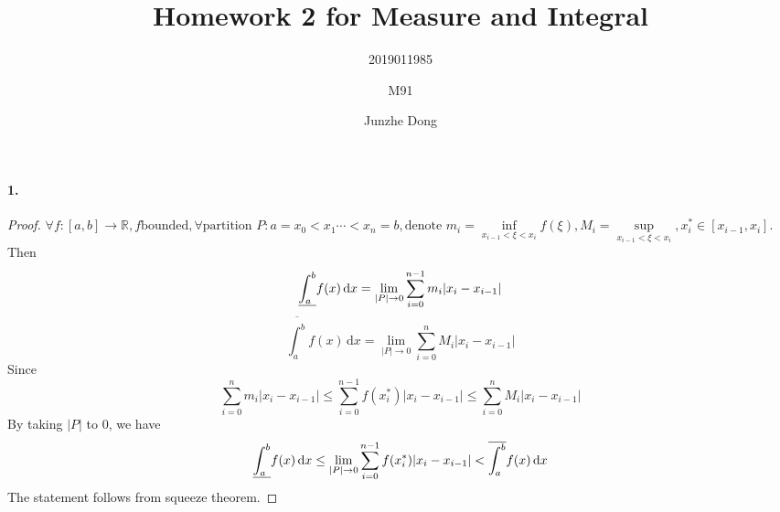 \documentclass{article}
\author{2019011985\and M91\and Junzhe Dong}
\title{Homework 2 for Measure and Integral}
\begin{document}
\maketitle

\newcommand{\dd}{\,\mathrm{d}}
\newcommand{\pc}{\text{ p.c.}}
\newcommand{\st}{\text{ s.t.}}
\paragraph{1.}
\begin{proof}
$\forall f:[a,b]\to\mathbb{R}, f \text{bounded}, \forall \text{partition } P:a=x_0<x_1\cdots <x_n=b, \text{denote } m_i=\inf\limits_{x_{i-1}<\xi <x_i}f(\xi), M_i=\sup\limits_{x_{i-1}<\xi <x_i}, x_i^*\in [x_{i-1},x_i]$. Then 
\[\uline{\int^b_a}f(x)\dd x =\lim_{|P|\to 0}\sum_{i=0}^{n-1} m_i|x_i-x_{i-1}|\]
\[\overline{\int^b_a}f(x)\dd x =\lim_{|P|\to 0}\sum_{i=0}^n M_i|x_i-x_{i-1}|\]
Since
\[\sum_{i=0}^n m_i|x_i-x_{i-1}|\leq \sum_{i=0}^{n-1}f(x_i^*)|x_i-x_{i-1}|\leq \sum_{i=0}^n M_i|x_i-x_{i-1}|\]
By taking $|P|$ to 0, we have
\[\uline{\int^b_a}f(x)\dd x\leq \lim_{|P|\to 0}\sum_{i=0}^{n-1}f(x_i^*)|x_i-x_{i-1}|<\overline{\int^b_a}f(x)\dd x\]
The statement follows from squeeze theorem.
\end{proof}
\end{document}
